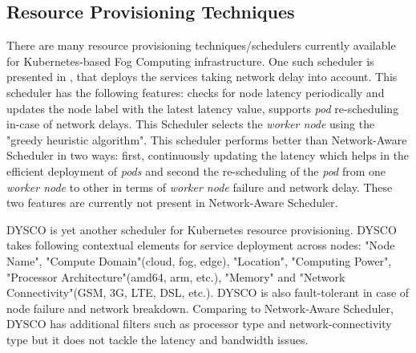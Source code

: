 \subsection{Resource Provisioning Techniques}
There are many resource provisioning techniques/schedulers currently available for Kubernetes-based Fog Computing infrastructure. One such scheduler is presented in \cite{Haja2019}, that deploys the services taking network delay into account. This scheduler\cite{Haja2019} has the following features: checks for node latency periodically and updates the node label with the latest latency value, supports \emph{pod} re-scheduling in-case of network delays. This Scheduler\cite{Haja2019} selects the \emph{worker node} using the "greedy heuristic algorithm". This scheduler\cite{Haja2019} performs better than Network-Aware Scheduler\cite{Santos2019} in two ways: first, continuously updating the latency which helps in the efficient deployment of \emph{pods} and second the re-scheduling of the \emph{pod} from one \emph{worker node} to other in terms of \emph{worker node} failure and network delay. These two features are currently not present in Network-Aware Scheduler.\par
DYSCO\cite{Mittermeier2018} is yet another scheduler for Kubernetes resource provisioning. DYSCO takes following contextual elements for service deployment across nodes\cite{Mittermeier2018}: "Node Name", "Compute Domain"(cloud, fog, edge), "Location", "Computing Power", "Processor Architecture"(amd64, arm, etc.), "Memory" and "Network Connectivity"(GSM, 3G, LTE, DSL, etc.). DYSCO is also fault-tolerant in case of node failure and network breakdown\cite{Mittermeier2018}. Comparing to Network-Aware Scheduler\cite{Santos2019}, DYSCO\cite{Mittermeier2018} has additional filters such as processor type and network-connectivity type but it does not tackle the latency and bandwidth issues. \par
